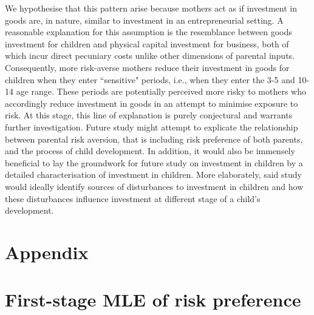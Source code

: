 \documentclass[emulatestandardclasses, 10pt, abstract = true]{scrartcl}
\begin{document}
We hypothesise that this pattern arise because mothers act as if investment in goods are, in nature, similar to investment in an entrepreneurial setting. A reasonable explanation for this assumption is the resemblance between goods investment for children and physical capital investment for business, both of which incur direct pecuniary costs unlike other dimensions of parental inputs. Consequently, more risk-averse mothers reduce their investment in goods for children when they enter ``sensitive" periods, i.e., when they enter the 3-5 and 10-14 age range. These periods are potentially perceived more risky to mothers who accordingly reduce investment in goods in an attempt to minimise exposure to risk. At this stage, this line of explanation is purely conjectural and warrants further investigation. Future study might attempt to explicate the relationship between parental risk aversion, that is including risk preference of both parents, and the process of child development. In addition, it would also be immensely beneficial to lay the groundwork for future study on investment in children by a detailed characterisation of investment in children. More elaborately, said study would ideally identify sources of disturbances to investment in children and how these disturbances influence investment at different stage of a child's development.




\pagebreak





\pagebreak

\section*{Appendix}
\appendix

\setcounter{secnumdepth}{3}

\section{First-stage MLE of risk preference}
\end{document}

